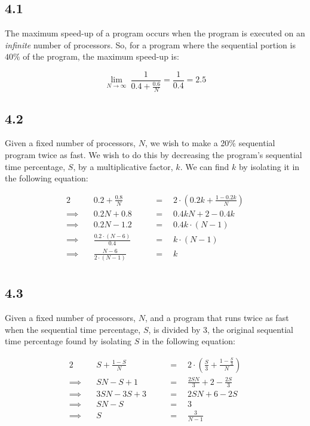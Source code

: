 \documentclass[11pt, letterpaper]{article}
\begin{document}
\subsection*{4.1}

The maximum speed-up of a program occurs when the program is executed on an \textit{infinite} number of processors. So, for a program where the sequential portion is $40\%$ of the program, the maximum speed-up is:

$$
\lim_{N \to \infty}\ {\frac{1}{0.4 + \frac{0.6}{N}}} = \frac{1}{0.4} = 2.5
$$

\subsection*{4.2}

Given a fixed number of processors, $N$, we wish to make a 20\% sequential program twice as fast. We wish to do this by decreasing the program's sequential time percentage, $S$, by a multiplicative factor, $k$. We can find $k$ by isolating it in the following equation:

\begin{alignat*}{2}
            & \quad 0.2 + \frac{0.8}{N}           \quad &&= \quad 2 \cdot \left(0.2 k + \frac{1 - 0.2 k}{N}\right)\\
    \implies& \quad 0.2N + 0.8                    \quad &&= \quad 0.4kN + 2 - 0.4k\\
    \implies& \quad 0.2N - 1.2                    \quad &&= \quad 0.4k \cdot (N - 1)\\
    \implies& \quad \frac{0.2 \cdot (N - 6)}{0.4} \quad &&= \quad k \cdot (N - 1)\\
    \implies& \quad \frac{N - 6}{2 \cdot (N - 1)} \quad &&= \quad k\\
\end{alignat*}

\pagebreak
\subsection*{4.3}

Given a fixed number of processors, $N$, and a program that runs twice as fast when the sequential time percentage, $S$, is divided by 3, the original sequential time percentage found by isolating $S$ in the following equation:

\begin{alignat*}{2}
            & \quad S + \frac{1-S}{N} \quad &&= \quad 2 \cdot \left(\frac{S}{3} + \frac{1-\frac{S}{3}}{N}\right)\\
    \implies& \quad SN - S + 1 \quad        &&= \quad \frac{2SN}{3} + 2 - \frac{2S}{3}\\
    \implies& \quad 3SN - 3S + 3 \quad      &&= \quad 2SN + 6 - 2S\\
    \implies& \quad SN - S \quad            &&= \quad 3\\
    \implies& \quad S \quad                 &&= \quad \frac{3}{N - 1}\\
\end{alignat*}
\end{document}
